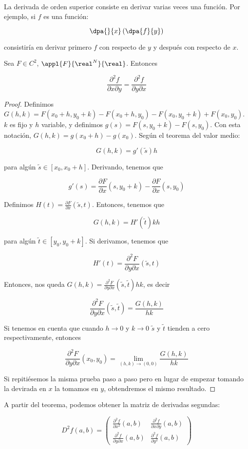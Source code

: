 \documentclass[12pt,a4paper,titlepage]{apuntes}
\begin{document}
La derivada de orden superior consiste en derivar varias veces una función. Por ejemplo, si $f$ es una función:

\[ \dpa{}{x}\left(\dpa{f}{y}\right)  \]

consistiría en derivar primero $f$ con respecto de $y$ y después con respecto de $x$.

\begin{theorem}
Sea $F\in C^2$, $\appl{F}{\real^N}{\real}$. Entonces

\[ \frac{∂^2 f}{∂x∂y} = \frac{∂^2 f}{∂y∂x} \]
\end{theorem}

\begin{proof}
Definimos $G(h,k) = F(x_0+h, y_0+k) - F(x_0+h, y_0) - F(x_0, y_0 +k) + F(x_0, y_0)$. $k$ es fijo y $h$ variable, y definimos $g(s) = F(s, y_0 + k) - F(s, y_0)$. Con esta notación, $G(h,k) = g(x_0+h) - g(x_0)$. Según el teorema del valor medio:

\[ G(h,k) = g'(\tilde{s})h \]

para algún $\tilde{s} \in [x_0, x_0+h]$. Derivando, tenemos que

\[ g'(s) = \frac{∂F}{∂x}(s, y_0+k) - \frac{∂F}{∂x} (s, y_0) \]

Definimos $H(t) = \frac{∂F}{∂x} (\tilde{s}, t)$. Entonces, tenemos que 

\[G(h,k) = H'(\tilde{t})kh \]

para algún  $\tilde{t} \in [y_0, y_0+k]$. Si derivamos, tenemos que 

\[ H'(t) = \frac{∂^2 F}{∂y∂x}(\tilde{s}, t) \]

Entonces, nos queda $G(h,k) = \frac{∂^2F}{∂y∂x}(\tilde{s}, \tilde{t}) h k$, es decir

\[\frac{∂^2F}{∂y∂x}(\tilde{s}, \tilde{t}) = \frac{G(h,k)}{hk} \]

Si tenemos en cuenta que cuando $h\to 0$ y $k\to 0$ $\tilde{s}$ y $\tilde{t}$ tienden a cero respectivamente, entonces

\[ \frac{∂^2F}{∂y∂x}(x_0, y_0) = \lim_{(h,k) \to (0,0)} \frac{G(h,k)}{hk} \] 

Si repitiésemos la misma prueba paso a paso pero en lugar de empezar tomando la devirada en $x$ la tomamos en $y$, obtendremos el mismo resultado.
\end{proof}

A partir del teorema, podemos obtener la matriz de derivadas segundas:

\begin{defn}
\[D^2f(a,b) = \left(\begin{matrix} \frac{\partial^2 f}{∂ x^2} (a,b) & \frac{\partial^2 f}{\partial x \partial y} (a,b) 
\\ \frac{\partial^2 f}{\partial y \partial x} (a,b) & \frac{\partial^2 f}{\partial y^2} (a,b) \end{matrix}\right) \]
\end{defn}
\end{document}
